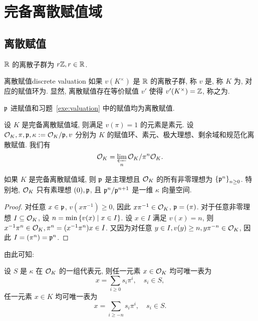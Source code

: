 \section{完备离散赋值域}

\subsection{离散赋值}
\begin{exercise}
${\mathbb{R}}$ 的离散子群为 $r{\mathbb{Z}},r\in {\mathbb{R}}$.
\end{exercise}

\begin{definition}{离散赋值}{discrete valuation}
如果 $v(K^\times)$ 是 ${\mathbb{R}}$ 的离散子群, 称 $v$ 是, 称 $K$ 为, 对应的赋值环为. 显然, 离散赋值存在等价赋值 $v'$ 使得 $v'(K^\times)={\mathbb{Z}}$, 称之为.
\end{definition}

\begin{example}
${\mathfrak{p}}$ 进赋值和习题~\ref{exe:valuation} 中的赋值均为离散赋值.
\end{example}

设 $K$ 是完备离散赋值域, 则满足 $v(\pi)=1$ 的元素是素元. 设${\mathcal{O}}_K,\pi,{\mathfrak{p}},\kappa:={\mathcal{O}}_K/{\mathfrak{p}}, v$ 分别为 $K$ 的赋值环、素元、极大理想、剩余域和规范化离散赋值. 我们有
  \[{\mathcal{O}}_K=\varprojlim\limits_n {\mathcal{O}}_K/\pi^n {\mathcal{O}}_K.\]

\begin{proposition}{}{}
如果 $K$ 是完备离散赋值域, 则 ${\mathfrak{p}}$ 是主理想且 ${\mathcal{O}}_K$ 的所有非零理想为 $\left\{{\mathfrak{p}}^n\right\}_{n\ge 0}$. 特别地, ${\mathcal{O}}_K$ 只有素理想 $(0),{\mathfrak{p}}$, 且 ${\mathfrak{p}}^n/{\mathfrak{p}}^{n+1}$ 是一维 $\kappa$ 向量空间.
\end{proposition}
\begin{proof}
对任意 $x\in{\mathfrak{p}}$, $v(x\pi^{-1})\ge 0$, 因此 $x\pi^{-1}\in{\mathcal{O}}_K$, ${\mathfrak{p}}=(\pi)$. 对于任意非零理想 $I\subseteq{\mathcal{O}}_K$, 设 $n=\min\left\{v(x)\mid x\in I\right\}$. 设 $x\in I$ 满足 $v(x)=n$, 则 $x^{-1}\pi^n\in {\mathcal{O}}_K, \pi^n=(x^{-1}\pi^n)x\in I$. 又因为对任意 $y\in I, v(y)\ge n, y\pi^{-n}\in{\mathcal{O}}_K$, 因此 $I=(\pi^n)={\mathfrak{p}}^n$.
\end{proof}

由此可知:
\begin{proposition}{}{}
设 $S$ 是 $\kappa$ 在 ${\mathcal{O}}_K$ 的一组代表元, 则任一元素 $x\in{\mathcal{O}}_K$ 均可唯一表为
  \[x=\sum_{i\ge 0} s_i\pi^i,\quad s_i\in S,\]
任一元素 $x\in K$ 均可唯一表为
  \[x=\sum_{i\ge -n} s_i\pi^i,\quad s_i\in S.\]
\end{proposition}

